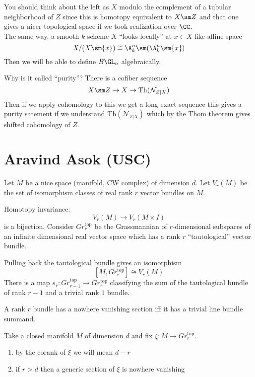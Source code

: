 \documentclass{article}
\newcommand{\Th}{\mathrm{Th}}
\newcommand{\cN}{\mathcal{N}}
\begin{document}
You should think about the left as $X$ modulo the complement of a tubular neighborhood of $Z$ since this is homotopy equivalent to $X \sm Z$ and that one gives a nicer topological space if we took realization over $\CC$.
\bigskip\\
The same way, a smooth $k$-scheme $X$ ``looks locally'' at $x \in X$ like affine space
\[ X / (X \sm \{ x \}) \cong \A^n_k \sm (\A^n_k \sm \{ x \}) \]
Then we will be able to define $B \GL_n$ algebraically. 

\begin{rmk}
Why is it called ``purity''? There is a cofiber sequence
\[ X \sm Z \to X \to \Th(\cN_{Z|X}) \]
Then if we apply cohomology to this we get a long exact sequence this gives a purity satement if we understand $\Th(\cN_{Z|X})$ which by the Thom theorem gives shifted cohomology of $Z$. 
\end{rmk}

\section{Aravind Asok (USC)}

Let $M$ be a nice space (manifold, CW complex) of dimension $d$. Let $V_r(M)$ be the set of isomorphism classes of real rank $r$ vector bundles on $M$. 

Homotopy invariance:
\[ V_r(M) \to V_r(M \times I) \]
is a bijection. Consider $Gr_r^{\text{top}}$ be the Grassmannian of $r$-dimensional subspaces of an infinite dimensional real vector space which has a rank $r$ ``tautological'' vector bundle. 

\begin{theorem}
Pulling back the tautological bundle gives an isomorphism
\[ [M, Gr_r^{\text{top}}] \cong V_r(M) \]
There is a map $s_r : Gr_{r-1}^{\text{top}} \to Gr_r^{\text{top}}$ classifying the sum of the tautological bundle of rank $r-1$ and a trivial rank $1$ bundle.
\end{theorem}

A rank $r$ bundle has a nowhere vanishing section iff it has a trivial line bundle summand.


Take a closed manifold $M$ of dimension $d$ and fix $\xi : M \to Gr_r^{\text{top}}$. 
\begin{enumerate}
\item by the corank of $\xi$ we will mean $d-r$
\item if $r > d$ then a generic section of $\xi$ is nowhere vanishing
\end{enumerate} 
\end{document}
